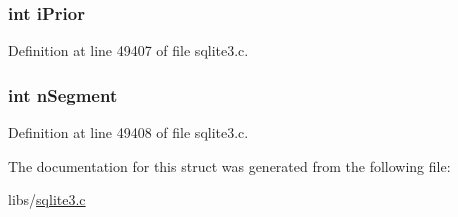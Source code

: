 \subsubsection[{i\+Prior}]{\setlength{\rightskip}{0pt plus 5cm}int i\+Prior}\label{struct_wal_iterator_a92ff55de6843760938bdac08a9ed69f8}


Definition at line 49407 of file sqlite3.\+c.

\hypertarget{struct_wal_iterator_a8f89d325bc616cb72479c74b15841b8f}{}
\subsubsection[{n\+Segment}]{\setlength{\rightskip}{0pt plus 5cm}int n\+Segment}\label{struct_wal_iterator_a8f89d325bc616cb72479c74b15841b8f}


Definition at line 49408 of file sqlite3.\+c.



The documentation for this struct was generated from the following file\+:\begin{DoxyCompactItemize}
\item 
libs/\hyperlink{sqlite3_8c}{sqlite3.\+c}\end{DoxyCompactItemize}
